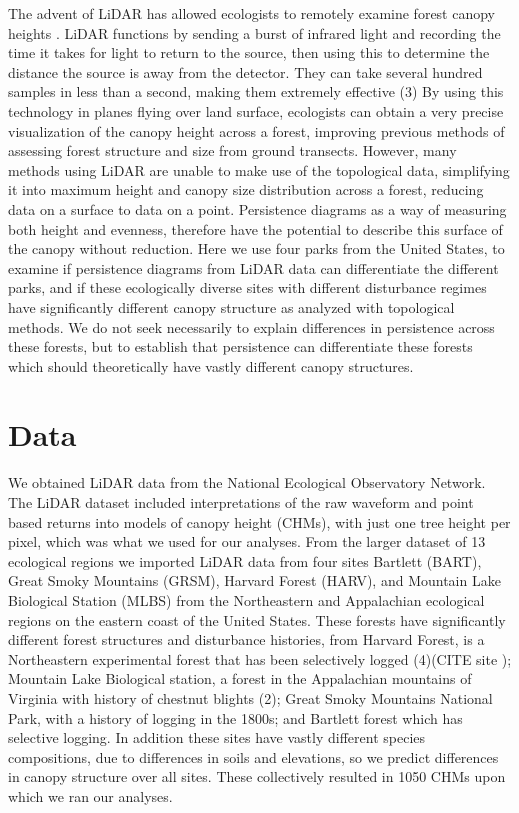 \documentclass[10pt]{article}
\begin{document}
\indent The advent of LiDAR has allowed ecologists to remotely examine forest canopy heights . LiDAR functions by sending a burst of infrared light and recording the time it takes for light to return to the source, then using this to determine the distance the source is away from the detector. They can take several hundred samples in less than a second, making them extremely effective (3) By using this technology in planes flying over land surface, ecologists can obtain a very precise visualization of the canopy height across a forest, improving previous methods of assessing forest structure and size from ground transects. However, many methods using LiDAR are unable to make use of the topological data, simplifying it into maximum height and canopy size distribution across a forest, reducing data on a surface to data on a point. Persistence diagrams as a way of measuring both height and evenness, therefore have the potential to describe this surface of the canopy without reduction. Here we use four parks from the United States, to examine if persistence diagrams from LiDAR data can differentiate the different parks, and if these ecologically diverse sites with different disturbance regimes have significantly different canopy structure as analyzed with topological methods. We do not seek necessarily to explain differences in persistence across these forests, but to establish that persistence can differentiate these forests which should theoretically have vastly different canopy structures.


\section*{Data}
\indent We obtained LiDAR data from the National Ecological Observatory Network. The LiDAR dataset included interpretations of the raw waveform and point based returns into models of canopy height (CHMs), with just one tree height per pixel, which was what we used for our analyses. From the larger dataset of 13 ecological regions we imported LiDAR data from four sites Bartlett (BART), Great Smoky Mountains (GRSM), Harvard Forest (HARV), and Mountain Lake Biological Station (MLBS) from the Northeastern and Appalachian ecological regions on the eastern coast of the United States. These forests have significantly different forest structures and disturbance histories, from Harvard Forest, is a Northeastern experimental forest that has been selectively logged (4)(CITE site ); Mountain Lake Biological station, a forest in the Appalachian mountains of Virginia with history of chestnut blights (2); Great Smoky Mountains National Park, with a history of logging in the 1800s; and Bartlett forest which has selective logging. In addition these sites have vastly different species compositions, due to differences in soils and elevations, so we predict differences in canopy structure over all sites. These collectively resulted in 1050 CHMs upon which we ran our analyses.
\end{document}

